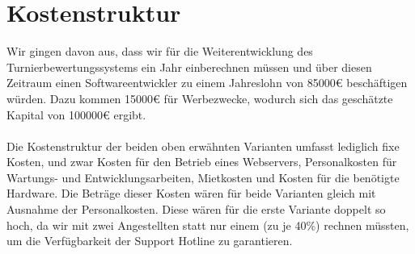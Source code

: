 \section{Kostenstruktur}

Wir gingen davon aus, dass wir für die Weiterentwicklung des Turnierbewertungssystems ein Jahr einberechnen müssen und über
    diesen Zeitraum einen Softwareentwickler zu einem Jahreslohn von 85000€ beschäftigen würden.
Dazu kommen 15000€ für Werbezwecke, wodurch sich das geschätzte Kapital von 100000€ ergibt.
\\\\
Die Kostenstruktur der beiden oben erwähnten Varianten umfasst lediglich fixe Kosten, und zwar Kosten für den Betrieb
    eines Webservers, Personalkosten für Wartungs- und Entwicklungsarbeiten, Mietkosten und Kosten für die benötigte Hardware.
Die Beträge dieser Kosten wären für beide Varianten gleich mit Ausnahme der Personalkosten.
Diese wären für die erste Variante doppelt so hoch, da wir mit zwei Angestellten statt nur einem (zu je 40\%) rechnen
    müssten, um die Verfügbarkeit der Support Hotline zu garantieren.

